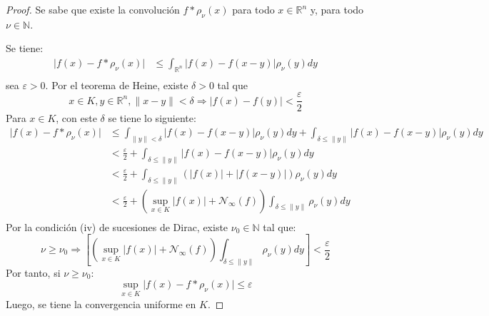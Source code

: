 \documentclass[12pt]{report}
\theoremstyle{largebreak}
\newcommand\abs[1]{\ensuremath{\big|#1\big|}}
\newcommand\norm[1]{\ensuremath{\|#1\|}}
\newcommand{\N}[2]{\ensuremath{\mathcal{N}_{#1}\left(#2\right)}}
\begin{document}
    \begin{proof}
        Se sabe que existe la convolución $f*\rho_\nu(x)$ para todo $x\in\mathbb{R}^n$ y, para todo $\nu\in\mathbb{N}$.

        Se tiene:
        \begin{equation*}
            \begin{split}
                \abs{f(x)-f*\rho_\nu(x)}&\leq\int_{\mathbb{R}^n}\abs{f(x)-f(x-y)}\rho_\nu(y)dy\\
            \end{split}
        \end{equation*}
        sea $\varepsilon>0$. Por el teorema de Heine, existe $\delta>0$ tal que
        \begin{equation*}
            x\in K,y\in\mathbb{R}^n,\norm{x-y}<\delta\Rightarrow\abs{f(x)-f(y)}<\frac{\varepsilon}{2}
        \end{equation*}
        Para $x\in K$, con este $\delta$ se tiene lo siguiente:
        \begin{equation*}
            \begin{split}
                \abs{f(x)-f*\rho_\nu(x)}&\leq\int_{\norm{y}<\delta}\abs{f(x)-f(x-y)}\rho_\nu(y)dy+\int_{\delta\leq\norm{y}}\abs{f(x)-f(x-y)}\rho_\nu(y)dy\\
                &<\frac{\varepsilon}{2}+\int_{\delta\leq\norm{y}}\abs{f(x)-f(x-y)}\rho_\nu(y)dy\\
                &<\frac{\varepsilon}{2}+\int_{\delta\leq\norm{y}}\left(\abs{f(x)}+\abs{f(x-y)}\right)\rho_\nu(y)dy\\
                &<\frac{\varepsilon}{2}+\left(\sup_{x\in K}\abs{f(x)}+\N{\infty}{f}\right)\int_{\delta\leq\norm{y}}\rho_\nu(y)dy\\
            \end{split}
        \end{equation*}
        Por la condición (iv) de sucesiones de Dirac, existe $\nu_0\in\mathbb{N}$ tal que:
        \begin{equation*}
            \nu\geq\nu_0\Rightarrow\left[\left(\sup_{x\in K}\abs{f(x)}+\N{\infty}{f}\right)\int_{\delta\leq\norm{y}}\rho_\nu(y)dy \right]<\frac{\varepsilon}{2}
        \end{equation*}
        Por tanto, si $\nu\geq\nu_0$:
        \begin{equation*}
            \sup_{x\in K}\abs{f(x)-f*\rho_\nu(x)}\leq\varepsilon
        \end{equation*}
        Luego, se tiene la convergencia uniforme en $K$.
    \end{proof}
\end{document}
